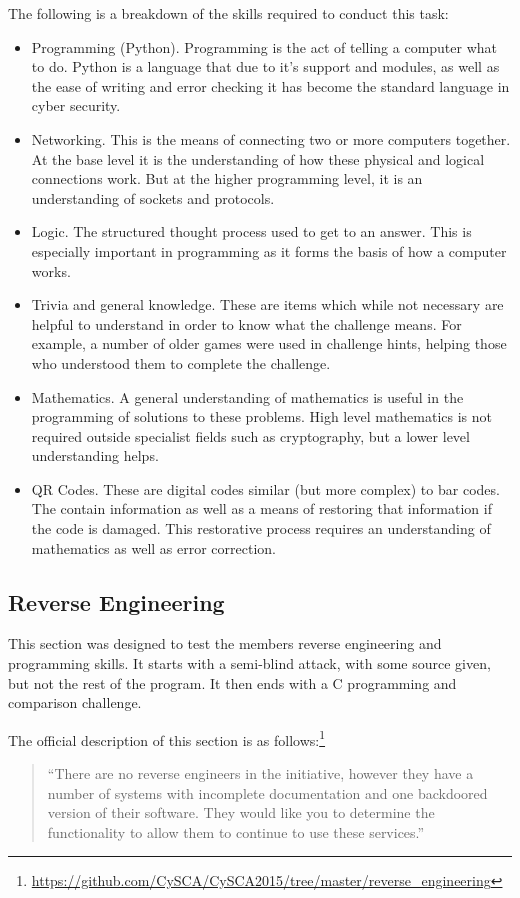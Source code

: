 \documentclass[a4paper,11pt]{report}
\begin{document}
			The following is a breakdown of the skills required to conduct this task:
			\begin{itemize}
				\item Programming (Python).
					Programming is the act of telling a computer what to do. 
					Python is a language that due to it's support and modules, as well as the ease of writing and error checking it has become the standard language in cyber security. 
				\item Networking.
					This is the means of connecting two or more computers together. 
					At the base level it is the understanding of how these physical and logical connections work. 
					But at the higher programming level, it is an understanding of sockets and protocols. 
				\item Logic.
					The structured thought process used to get to an answer. 
					This is especially important in programming as it forms the basis of how a computer works. 
				\item Trivia and general knowledge. 
					These are items which while not necessary are helpful to understand in order to know what the challenge means. 
					For example, a number of older games were used in challenge hints, helping those who understood them to complete the challenge. 
				\item Mathematics. 
					A general understanding of mathematics is useful in the programming of solutions to these problems. 
					High level mathematics is not required outside specialist fields such as cryptography, but a lower level understanding helps. 
				\item QR Codes.
					These are digital codes similar (but more complex) to bar codes.
					The contain information as well as a means of restoring that information if the code is damaged. 
					This restorative process requires an understanding of mathematics as well as error correction. 
			\end{itemize}

		\subsection{Reverse Engineering}
			This section was designed to test the members reverse engineering and programming skills. 
			It starts with a semi-blind attack, with some source given, but not the rest of the program. 
			It then ends with a C programming and comparison challenge. 
			
			The official description of this section is as follows:\footnote{\url{https://github.com/CySCA/CySCA2015/tree/master/reverse\_engineering}}
			\begin{quote}
				``There are no reverse engineers in the initiative, however they have a number of systems with incomplete documentation and one backdoored version of their software. They would like you to determine the functionality to allow them to continue to use these services.''
			\end{quote}
\end{document}
